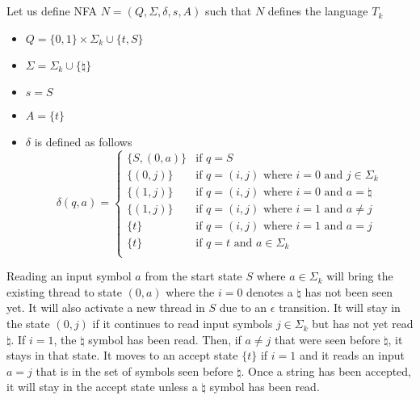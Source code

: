 \documentclass[11pt]{article}
\begin{document}
\subsection*{}
Let us define NFA $N=(Q,\Sigma,\delta,s,A)$ such that $N$ defines the language $T_k$
\begin{itemize}
	\item $Q=\{0, 1\} \times \Sigma_k \cup\{t,S\}$
	\item $\Sigma=\Sigma_k \cup\{\natural\}$
	\item $s=S$
	\item $A=\{t\}$
	\item $\delta$ is defined as follows \\ \[\delta(q,a)=\begin{cases}
		\{S, (0,a)\} & \text{if }q=S \\
        \{(0, j)\} & \text{if }q=(i, j)\text{ where }i=0\text{ and }j\in\Sigma_k \\
		\{(1,j)\} & \text{if }q=(i, j)\text{ where }i=0\text{ and }a=\natural \\
		\{(1,j)\} & \text{if }q=(i, j)\text{ where }i=1\text{ and }a\neq j \\
		\{t\} & \text{if }q=(i, j)\text{ where }i=1\text{ and }a=j \\
		\{t\} & \text{if }q=t\text{ and }a\in\Sigma_k\\
	\end{cases}\]
\end{itemize}
Reading an input symbol $a$ from the start state $S$ where $a \in\Sigma_k$ will bring the existing thread to state $(0,a)$ where the $i=0$ denotes a $\natural$ has not been seen yet. It will also activate a new thread in $S$ due to an $\epsilon$ transition. It will stay in the state $(0, j)$ if it continues to read input symbols $j\in \Sigma_k$ but has not yet read $\natural$.
If $i=1$, the $\natural$ symbol has been read. Then, if $a\neq j$ that were seen before $\natural$, it stays in that state. It moves to an accept state $\{t\}$ if $i=1$ and it reads an input $a=j$ that is in the set of symbols seen before $\natural$. Once a string has been accepted, it will stay in the accept state unless a $\natural$ symbol has been read. 
\end{document}
